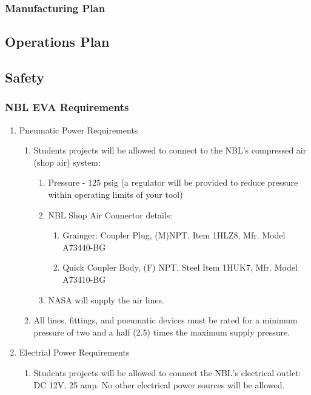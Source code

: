 \documentclass{article}
\begin{document}
\subsubsection{Manufacturing Plan}
\subsection{Operations Plan}
\subsection{Safety}
\subsubsection{NBL EVA Requirements}
\begin{enumerate}
    \item Pneumatic Power Requirements
    \begin{enumerate}
        \item Students projects will be allowed to connect to the NBL's compressed air (shop air) system:
        \begin{enumerate}
            \item Pressure - 125 psig (a regulator will be provided to reduce pressure within operating limits of your tool)
            \item NBL Shop Air Connector details:
            \begin{enumerate}
                \item Grainger: Coupler Plug, (M)NPT, Item 1HLZ8, Mfr. Model A73440-BG
                \item Quick Coupler Body, (F) NPT, Steel Item 1HUK7, Mfr. Model A73410-BG
            \end{enumerate}
            \item NASA will supply the air lines.
        \end{enumerate}
        \item All lines, fittings, and pneumatic devices must be rated for a minimum pressure of two and a half (2.5) times the maximum supply pressure.
    \end{enumerate}
    \item Electrial Power Requirements
    \begin{enumerate}
        \item Students projects will be allowed to connect the NBL's electrical outlet: DC 12V, 25 amp. No other electrical power sources will be allowed.
        \begin{enumerate}

\end{enumerate}
\end{enumerate}
\end{enumerate}
\end{document}

